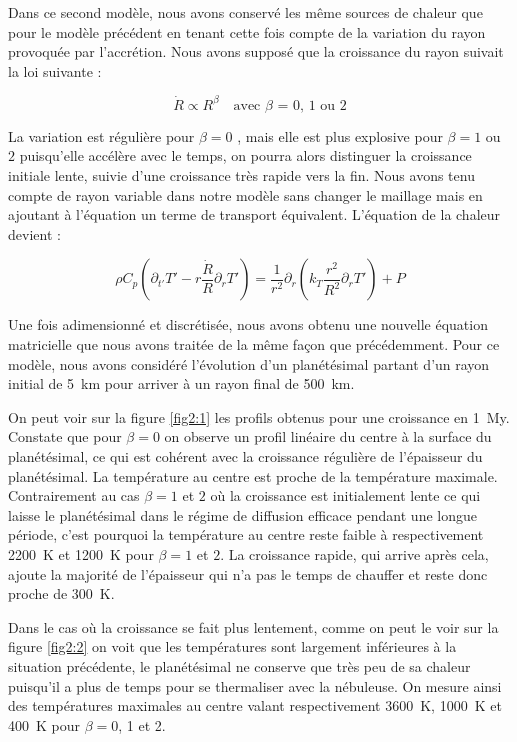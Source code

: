 \documentclass[10pt,a4paper]{article}
\numberwithin{equation}{section}
\begin{document}
Dans ce second modèle, nous avons conservé les même sources de chaleur que pour le modèle précédent en tenant cette fois compte de la variation du rayon provoquée par l'accrétion. Nous avons supposé que la croissance du rayon suivait la loi suivante :

\begin{equation}
\dot{R} \propto R^\beta  \quad \textrm{avec $\beta$ = 0, 1 ou 2}
\end{equation}

La variation est régulière pour $\beta = 0$ , mais elle est plus explosive pour $\beta = 1$ ou $2$ puisqu'elle accélère avec le temps, on pourra alors distinguer la croissance initiale lente, suivie d'une croissance très rapide vers la fin. 
Nous avons tenu compte de rayon variable dans notre modèle sans changer le maillage mais en ajoutant à l'équation un terme de transport équivalent. L'équation de la chaleur devient :

\begin{equation}
\rho C_p (\partial_{t'} T' - r \frac{\dot{R}}{R}\partial_{r} T')= \frac{1}{r^2} \partial_{r} ( k_{T} \frac{r^2}{R^2} \partial_{r} T')  + P
\end{equation}

Une fois adimensionné et discrétisée, nous avons obtenu une nouvelle équation matricielle que nous avons traitée de la même façon que précédemment.
Pour ce modèle, nous avons considéré l'évolution d'un planétésimal partant d'un rayon initial de \SI{5}{km} pour arriver à un rayon final de \SI{500}{km}. 

On peut voir sur la figure \ref{fig2:1} les profils obtenus pour une croissance en \SI{1}{My}. Constate que pour $\beta = 0$ on observe un profil linéaire du centre à la surface du planétésimal, ce qui est cohérent avec la croissance régulière de l'épaisseur du planétésimal. La température au centre est proche de la température maximale. Contrairement au cas $\beta = 1$ et $2$ où la croissance est initialement lente ce qui laisse le planétésimal dans le régime de diffusion efficace pendant une longue période, c'est pourquoi la température au centre reste faible à respectivement \SI{2200}{K} et \SI{1200}{K} pour $\beta = 1$ et $2$. La croissance rapide, qui arrive après cela, ajoute la majorité de l'épaisseur qui n'a pas le temps de chauffer et reste donc proche de \SI{300}{K}.

Dans le cas où la croissance se fait plus lentement, comme on peut le voir sur la figure \ref{fig2:2} on voit que les températures sont largement inférieures à la situation précédente, le planétésimal ne conserve que très peu de sa chaleur puisqu'il a plus de temps pour se thermaliser avec la nébuleuse. On mesure ainsi des températures maximales au centre valant respectivement \SI{3600}{K}, \SI{1000}{K} et \SI{400}{K} pour $\beta = 0$, 1 et 2.
\end{document}
